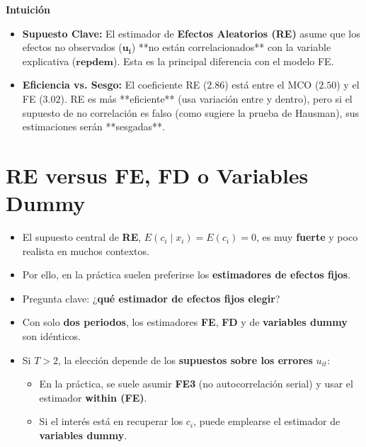 \documentclass[12pt]{article}
\begin{document}
\vspace{0.3cm}

\noindent\textbf{Intuición}
\begin{itemize}
    \item \textbf{Supuesto Clave:} El estimador de \textbf{Efectos Aleatorios (RE)} asume que los efectos no observados ($\mathbf{u_i}$) **no están correlacionados** con la variable explicativa ($\mathbf{repdem}$). Esta es la principal diferencia con el modelo FE.
    \item \textbf{Eficiencia vs. Sesgo:} El coeficiente RE ($\mathbf{2.86}$) está entre el MCO ($2.50$) y el FE ($3.02$). RE es más **eficiente** (usa variación entre y dentro), pero si el supuesto de no correlación es falso (como sugiere la prueba de Hausman), sus estimaciones serán **sesgadas**.
\end{itemize}

\section*{\noindent\textbf{RE versus FE, FD o Variables Dummy}}

\begin{itemize}
    \item El supuesto central de \textbf{RE}, $E(c_i \mid x_i) = E(c_i) = 0$, es muy \textbf{fuerte} y poco realista en muchos contextos.
    
    \item Por ello, en la práctica suelen preferirse los \textbf{estimadores de efectos fijos}.
    
    \item Pregunta clave: ¿\textbf{qué estimador de efectos fijos elegir}?
    
    \item Con solo \textbf{dos periodos}, los estimadores \textbf{FE}, \textbf{FD} y de \textbf{variables dummy} son idénticos.
    
    \item Si $T > 2$, la elección depende de los \textbf{supuestos sobre los errores} $u_{it}$:
    \begin{itemize}
        \item En la práctica, se suele asumir \textbf{FE3} (no autocorrelación serial) y usar el estimador \textbf{within (FE)}.
        \item Si el interés está en recuperar los $c_i$, puede emplearse el estimador de \textbf{variables dummy}.
    \end{itemize}
\end{itemize}
\end{document}
